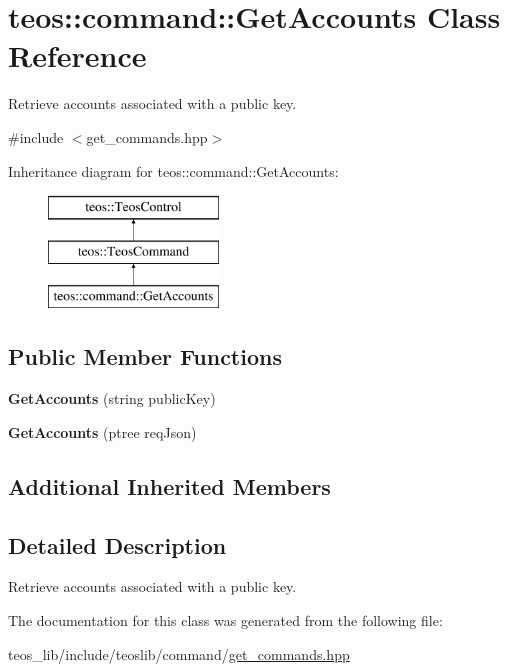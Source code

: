\hypertarget{classteos_1_1command_1_1_get_accounts}{}\section{teos\+:\+:command\+:\+:Get\+Accounts Class Reference}
\label{classteos_1_1command_1_1_get_accounts}


Retrieve accounts associated with a public key.  




{\ttfamily \#include $<$get\+\_\+commands.\+hpp$>$}

Inheritance diagram for teos\+:\+:command\+:\+:Get\+Accounts\+:\begin{figure}[H]
\begin{center}
\leavevmode
\includegraphics[height=3.000000cm]{classteos_1_1command_1_1_get_accounts}
\end{center}
\end{figure}
\subsection*{Public Member Functions}
\begin{DoxyCompactItemize}
\item 
\mbox{\label{classteos_1_1command_1_1_get_accounts_a603eb927fd9617cb566e20a550a399ee}} 
{\bfseries Get\+Accounts} (string public\+Key)
\item 
\mbox{\label{classteos_1_1command_1_1_get_accounts_aafacb3452faaab3051b2b2876461c01d}} 
{\bfseries Get\+Accounts} (ptree req\+Json)
\end{DoxyCompactItemize}
\subsection*{Additional Inherited Members}


\subsection{Detailed Description}
Retrieve accounts associated with a public key. 

The documentation for this class was generated from the following file\+:\begin{DoxyCompactItemize}
\item 
teos\+\_\+lib/include/teoslib/command/\mbox{\hyperlink{get__commands_8hpp}{get\+\_\+commands.\+hpp}}\end{DoxyCompactItemize}
